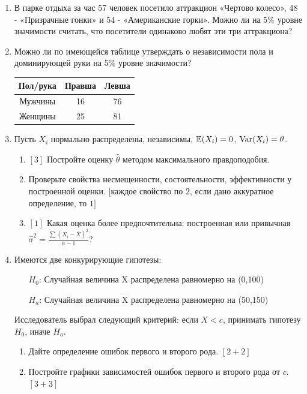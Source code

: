 \documentclass[12pt, a4paper]{article}\usepackage[]{graphicx}\usepackage[]{color}
\begin{document}
\begin{enumerate}
\item В парке отдыха за час 57 человек посетило аттракцион «Чертово
колесо», 48 - «Призрачные гонки» и 54 - «Американские горки». Можно ли на 5\% уровне значимости считать, что посетители
одинаково любят эти три аттракциона?

\item Можно ли по имеющейся таблице утверждать о независимости пола и
доминирующей руки на 5\% уровне значимости?

\begin{tabular}{|c|c|c|}
  \hline
  Пол/рука & Правша & Левша \\
  \hline
  Мужчины & 16 & 76 \\
  Женщины & 25 & 81 \\
  \hline
\end{tabular}

\item Пусть $X_{i}$ нормально распределены, независимы, $\mathbb{E}(X_{i})=0$,
$\operatorname{Var}(X_{i})=\theta$.
\begin{enumerate}
\item{} $[3]$ Постройте оценку $\hat{\theta}$ методом максимального
правдоподобия.
\item{} Проверьте свойства несмещенности, состоятельности,
эффективности у построенной оценки. $[$каждое свойство по $2$, если дано аккуратное определение, то $1]$
\item{} $[1]$ Какая оценка более предпочтительна: построенная или
привычная
$\hat{\sigma}^{2}=\frac{\sum(X_{i}-\bar{X})^{2}}{n-1}$?
\end{enumerate}

\item Имеются две конкурирующие гипотезы:
\begin{enumerate}
\item[$H_0$:] Случайная величина X распределена равномерно на (0,100)
\item[$H_a$:] Случайная величина X распределена равномерно на (50,150)
\end{enumerate}
Исследователь выбрал следующий критерий: если $X<c$, принимать гипотезу $H_0$, иначе  $H_a$.
\begin{enumerate}
\item Дайте определение ошибок первого и второго рода. $[2+2]$
\item Постройте графики зависимостей ошибок первого и второго рода от $c$. $[3+3]$
\end{enumerate}


\end{enumerate}
\end{document}
